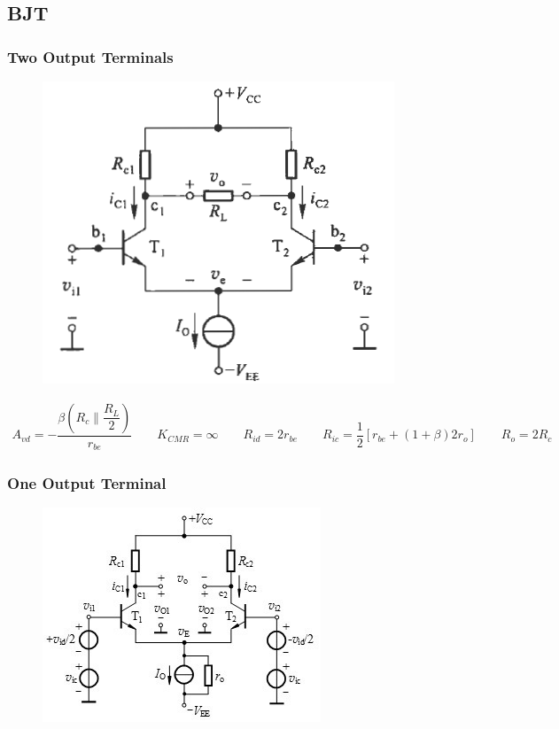 \subsection{BJT}

\subsubsection{Two Output Terminals}

\begin{figure}[H]
  \centering
  \includegraphics[width=0.7\linewidth]{figures/Differential-Amplifier-BJT-1}
\end{figure}

\begin{equation*}
  \begin{aligned}
    A_{vd} = - \dfrac{\beta \left( R_c \parallel \dfrac{R_L}{2} \right)}{r_{be}} \quad\quad K_{CMR} = \infty \quad\quad R_{id} = 2 r_{be} \quad\quad R_{ic} = \dfrac{1}{2} \left[ r_{be} + \left( 1 + \beta \right) 2 r_o \right] \quad\quad R_o = 2 R_c
  \end{aligned}
\end{equation*}

\subsubsection{One Output Terminal}

\begin{figure}[H]
  \centering
  \includegraphics[width=0.7\linewidth]{figures/Differential-Amplifier-BJT-2}
\end{figure}

